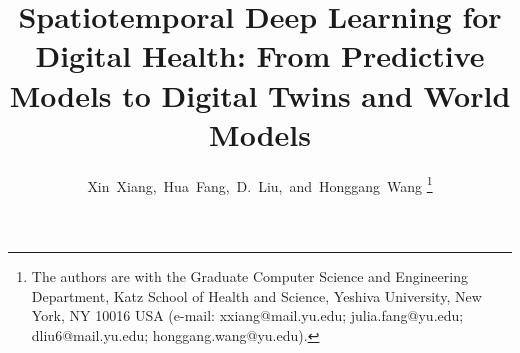 \documentclass[journal]{IEEEtran}
\begin{document}
\title{Spatiotemporal Deep Learning for Digital Health: From Predictive Models to Digital Twins and World Models}

\author{Xin~Xiang,~Hua~Fang,~D.~Liu,~and~Honggang~Wang%
\thanks{The authors are with the Graduate Computer Science and Engineering Department, Katz School of Health and Science, Yeshiva University, New York, NY 10016 USA (e-mail: xxiang@mail.yu.edu; julia.fang@yu.edu; dliu6@mail.yu.edu; honggang.wang@yu.edu).}}

\maketitle
\end{document}
